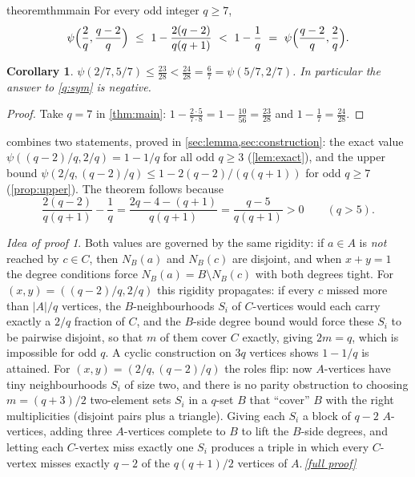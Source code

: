 \documentclass[11pt,a4paper]{article}
\theoremstyle{plain}
\newtheorem{corollary}[theorem]{Corollary}
\theoremstyle{definition}
\theoremstyle{remark}
\newtheorem*{proofidea}{Idea of proof}
\newcommand{\fullproofref}[1]{\,\hyperref[#1]{\textit{[full proof]}}}
\newcommand{\NB}{N_B}
\begin{document}
\begin{restatable}{theorem}{thmmain}\label{thm:main}
For every odd integer $q\ge7$,
\[
 \psi\Bigl(\frac2q,\frac{q-2}q\Bigr)\ \le\ 1-\frac{2(q-2)}{q(q+1)}\ <\ 1-\frac1q\ =\ \psi\Bigl(\frac{q-2}q,\frac2q\Bigr).
\]
\end{restatable}

\begin{corollary}\label{cor:main}
$\psi(2/7,5/7)\le\frac{23}{28}<\frac{24}{28}=\frac67=\psi(5/7,2/7)$. In particular the answer to \cref{q:sym} is negative.
\end{corollary}
\begin{proof}
Take $q=7$ in \cref{thm:main}: $1-\frac{2\cdot5}{7\cdot8}=1-\frac{10}{56}=\frac{23}{28}$ and $1-\frac17=\frac{24}{28}$.
\end{proof}

 combines two statements, proved in \cref{sec:lemma,sec:construction}: the exact value $\psi((q-2)/q,2/q)=1-1/q$ for all odd $q\ge3$ (\cref{lem:exact}), and the upper bound $\psi(2/q,(q-2)/q)\le1-2(q-2)/(q(q+1))$ for odd $q\ge7$ (\cref{prop:upper}). The theorem follows because
\begin{equation}\label{eq:gap}
 \frac{2(q-2)}{q(q+1)}-\frac1q=\frac{2q-4-(q+1)}{q(q+1)}=\frac{q-5}{q(q+1)}>0\qquad(q>5).
\end{equation}

\begin{proofidea}
Both values are governed by the same rigidity: if $a\in A$ is \emph{not} reached by $c\in C$, then $\NB(a)$ and $\NB(c)$ are disjoint, and when $x+y=1$ the degree conditions force $\NB(a)=B\setminus\NB(c)$ with both degrees tight. For $(x,y)=((q-2)/q,2/q)$ this rigidity propagates: if every $c$ missed more than $|A|/q$ vertices, the $B$-neighbourhoods $S_i$ of $C$-vertices would each carry exactly a $2/q$ fraction of $C$, and the $B$-side degree bound would force these $S_i$ to be pairwise disjoint, so that $m$ of them cover $C$ exactly, giving $2m=q$, which is impossible for odd $q$. A cyclic construction on $3q$ vertices shows $1-1/q$ is attained. For $(x,y)=(2/q,(q-2)/q)$ the roles flip: now $A$-vertices have tiny neighbourhoods $S_i$ of size two, and there is no parity obstruction to choosing $m=(q+3)/2$ two-element sets $S_i$ in a $q$-set $B$ that ``cover'' $B$ with the right multiplicities (disjoint pairs plus a triangle). Giving each $S_i$ a block of $q-2$ $A$-vertices, adding three $A$-vertices complete to $B$ to lift the $B$-side degrees, and letting each $C$-vertex miss exactly one $S_i$ produces a triple in which every $C$-vertex misses exactly $q-2$ of the $q(q+1)/2$ vertices of $A$.\fullproofref{pf:main}
\end{proofidea}
\end{document}
